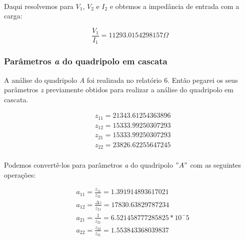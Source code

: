 \documentclass[12pt,twoside, a4paper, twocolumn]{article}
\begin{document}
\paragraph*{}
\paragraph*{}
Daqui resolvemos para $V_1$, $V_2$ e $I_2$ e obtemos a impedância de entrada com a carga:


\begin{equation}
    \frac{V_1}{I_1} = 11293.0154298157 \varOmega
\end{equation}


\subsubsection{Parâmetros \emph{a} do quadripolo em cascata}


A análise do quadripolo \emph{A} foi realizada no relatório 6. Então pegarei os seus parâmetros \emph{z} previamente obtidos para realizar a análise do quadripolo em cascata.


\begin{equation}
    \begin{aligned}
         & z_{11} = 21343.61254363896 \\
         & z_{12} = 15333.99250307293 \\
         & z_{21} = 15333.99250307293 \\
         & z_{22} = 23826.62255647245 \\
    \end{aligned}
\end{equation}


Podemos convertê-los para parâmetros \emph{a} do quadripolo $"A"$ com as seguintes operações:




\begin{equation}
    \begin{aligned}
         & a_{11} = \frac{z_{11}}{z_{21}} = 1.391914893617021      \\
         & a_{12} = \frac{\varDelta z}{z_{21}} = 17830.63829787234 \\
         & a_{21} = \frac{1}{z_{21}} = 6.521458777285825 * 10^-5   \\
         & a_{22} = \frac{z_{22}}{z_{21}} = 1.553843368039837
    \end{aligned}
\end{equation}
\end{document}

